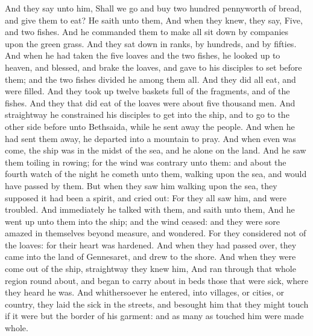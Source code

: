 {And they
say unto
him, Shall we
go and
buy two
hundred
pennyworth of
bread,
and
give
them to
eat?
He
saith unto
them,
{}
And when they
knew, they
say,
Five,
and
two
fishes.
And he
commanded
them to
make
all sit
down by
companies
upon the
green
grass.
And they sat
down in
ranks,
by
hundreds,
and
by
fifties.
And when he had
taken the
five
loaves
and the
two
fishes, he
looked up
to
heaven,
and
blessed, and
brake the
loaves,
and
gave
{} to
his
disciples
to set
before
them;
and the
two
fishes divided he
among them
all.
And they
did
all
eat,
and were
filled.
And they took
up
twelve
baskets
full of the
fragments,
and
of the
fishes.
And they
that did
eat of the
loaves
were
about five
thousand
men.
And
straightway he
constrained
his
disciples to
get
into the
ship,
and to
go
to the other
side before
unto
Bethsaida,
while
he sent
away the
people.
And when he had
sent
them
away, he
departed
into a
mountain to
pray.
And when
even was
come, the
ship
was
in the
midst of the
sea,
and
he
alone
on the
land.
And he
saw
them
toiling
in
rowing;
for the
wind
was
contrary unto
them:
and
about the
fourth
watch of the
night he
cometh
unto
them,
walking
upon the
sea,
and would
have passed
by
them.
But when they
saw
him
walking
upon the
sea, they
supposed it had
been a
spirit,
and cried
out:
For
they
all
saw
him,
and were
troubled.
And
immediately he
talked
with
them,
and
saith unto
them,
{}
And he went
up
unto
them
into the
ship;
and the
wind
ceased:
and they were
sore
amazed
in
themselves
beyond
measure,
and
wondered.
For they
considered
not
{}
of the
loaves:
for
their
heart
was
hardened.
And when they had passed
over, they
came
into the
land of
Gennesaret,
and drew to the
shore.
And when
they were come
out
of the
ship,
straightway they
knew
him,
And ran
through
that
whole region round
about, and
began to carry
about
in
beds those
that
were
sick,
where they
heard he
was.
And
whithersoever he
entered,
into
villages,
or
cities,
or
country, they
laid the
sick
in the
streets,
and
besought
him
that they might
touch if it were
but the
border of
his
garment:
and as many
as
touched
him were made
whole.

}
